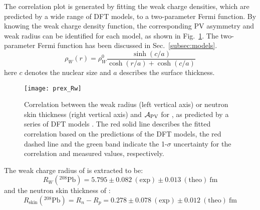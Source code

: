 The correlation plot is generated by fitting the weak charge densities, which are
predicted by a wide range of DFT models, to a two-parameter Fermi function. 
By knowing the weak charge density function, the corresponding PV asymmetry and
weak radius can be identified for each model, as shown in Fig.~\ref{fig:prex_Rw}.
The two-parameter Fermi function has been discussed in Sec.~\ref{subsec:models}.
\begin{equation*}
    \rho_W(r) = \rho_W^0 \frac{\sinh(c/a)}{\cosh(r/a) + \cosh(c/a)}
\end{equation*}
here $c$ denotes the nuclear size and $a$ describes the surface thickness. 

\begin{figure}[!h]
    \centering
    \texttt{[image: prex\_Rw]}
    \caption[Correlation between the weak radius/neutron skin thickness and $\CA_{\text{PV}}$]
    {Correlation between the weak radius (left vertical axis) or neutron skin thickness 
    (right vertical axis) and $\CA_{\text{PV}}$ for \Pb, as predicted by a series 
    of DFT models \cite{PhysRevLett.126.172502}. 
    The red solid line describes the fitted correlation based on the predictions of
    the DFT models, the red dashed line and the green band indicate the 1-$\sigma$ uncertainty 
    for the correlation and measured values, respectively.}
    \label{fig:prex_Rw}
\end{figure}


The weak charge radius of \Pb is extracted to be:
\begin{equation}
    R_W ({}^{208}\text{Pb}) = 5.795 \pm 0.082 \ (\text{exp}) \pm 0.013 \ (\text{theo})\ \mathrm{fm}
\end{equation}
and the neutron skin thickness of \Pb:
\begin{equation}
    R_{\text{skin}} ({}^{208}\text{Pb}) = R_n - R_p = 0.278 \pm 0.078 \ (\text{exp}) \pm 0.012 \ (\text{theo})\ \mathrm{fm}
\end{equation}

